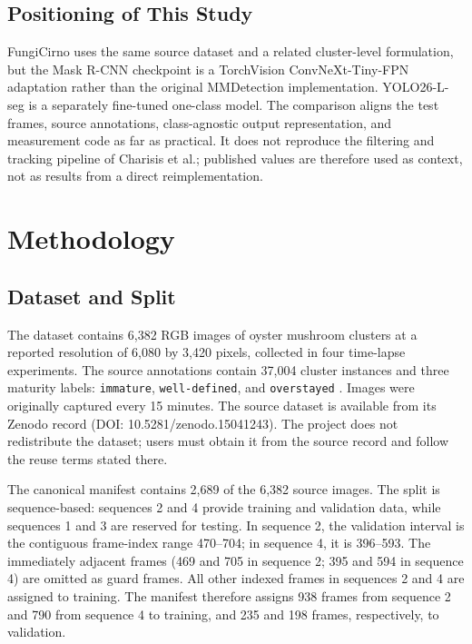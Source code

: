 \documentclass[11pt,a4paper]{article}
\begin{document}
\subsection{Positioning of This Study}

FungiCirno uses the same source dataset and a related cluster-level formulation, but the Mask R-CNN checkpoint is a TorchVision ConvNeXt-Tiny-FPN adaptation rather than the original MMDetection implementation. YOLO26-L-seg is a separately fine-tuned one-class model. The comparison aligns the test frames, source annotations, class-agnostic output representation, and measurement code as far as practical. It does not reproduce the filtering and tracking pipeline of Charisis et al.; published values are therefore used as context, not as results from a direct reimplementation.

\section{Methodology}

\subsection{Dataset and Split}

The dataset contains 6,382 RGB images of oyster mushroom clusters at a reported resolution of 6,080 by 3,420 pixels, collected in four time-lapse experiments. The source annotations contain 37,004 cluster instances and three maturity labels: \texttt{immature}, \texttt{well-defined}, and \texttt{overstayed} \cite{dataset,charisis}. Images were originally captured every 15 minutes. The source dataset is available from its Zenodo record (DOI: 10.5281/zenodo.15041243). The project does not redistribute the dataset; users must obtain it from the source record and follow the reuse terms stated there.

The canonical manifest contains 2,689 of the 6,382 source images. The split is sequence-based: sequences 2 and 4 provide training and validation data, while sequences 1 and 3 are reserved for testing. In sequence 2, the validation interval is the contiguous frame-index range 470--704; in sequence 4, it is 396--593. The immediately adjacent frames (469 and 705 in sequence 2; 395 and 594 in sequence 4) are omitted as guard frames. All other indexed frames in sequences 2 and 4 are assigned to training. The manifest therefore assigns 938 frames from sequence 2 and 790 from sequence 4 to training, and 235 and 198 frames, respectively, to validation.
\end{document}
